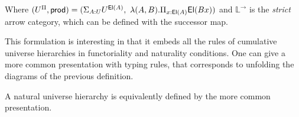 \documentclass{article}
\DeclarePairedDelimiter\brk{[}{]}
\begin{document}
\begin{definition}
    Where $(U^\Pi, \mathsf{prod})  = (\Sigma_{A:U} U^{\textsf{El}(A)}, \  \lambda (A,B). \Pi_{x: \textsf{El}(A)} \textsf{El}(B x))$ and $\mathbb{L}^\rightarrow$ is the \textit{strict} arrow
    category, which can be defined with the successor map.


\end{definition}

This formulation is interesting in that it embeds all the rules of cumulative universe hierarchies
in functoriality and naturality conditions. One can give a more common presentation with typing rules,
that corresponds to unfolding the diagrams of the previous definition.

\begin{proposition}\label{nat-hierarchy-rules}
    A natural universe hierarchy is equivalently defined by the more common presentation.
    
\end{proposition}
\end{document}
